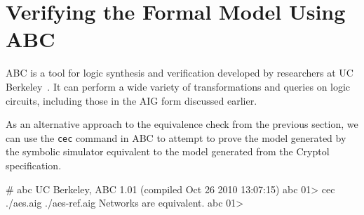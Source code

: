 \documentclass[11pt]{article}
\begin{document}
\section{Verifying the Formal Model Using ABC}

ABC is a tool for logic synthesis and verification developed by
researchers at UC Berkeley~\cite{abc}. It can perform a wide variety
of transformations and queries on logic circuits, including those in
the AIG form discussed earlier.

As an alternative approach to the equivalence check from the previous
section, we can use the \texttt{cec} command in ABC to attempt to
prove the model generated by the symbolic simulator equivalent to the
model generated from the Cryptol specification.

\begin{code}
# abc
UC Berkeley, ABC 1.01 (compiled Oct 26 2010 13:07:15)
abc 01> cec ./aes.aig ./aes-ref.aig
Networks are equivalent.
abc 01> 
\end{code}




\end{document}
